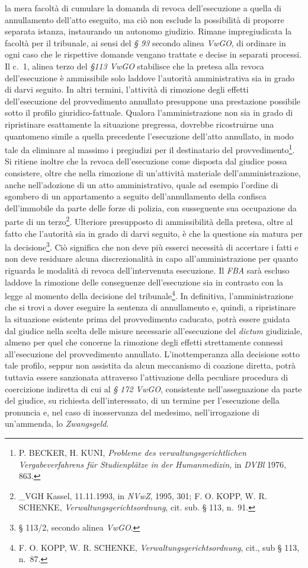 \documentclass[12pt,it,a4paper,]{report}
\begin{document}
la mera facoltà di cumulare la domanda di revoca dell'esecuzione a
quella di annullamento dell'atto eseguito, ma ciò non esclude la
possibilità di proporre separata istanza, instaurando un autonomo
giudizio. Rimane impregiudicata la facoltà per il tribunale, ai sensi
del \emph{§ 93} secondo alinea \emph{VwGO}, di ordinare in ogni caso che
le rispettive domande vengano trattate e decise in separati processi. Il
c.~1, alinea terzo del \emph{§113 VwGO} stabilisce che la pretesa alla
revoca dell'esecuzione è ammissibile solo laddove l'autorità
amministrativa sia in grado di darvi seguito. In altri termini,
l'attività di rimozione degli effetti dell'esecuzione del provvedimento
annullato presuppone una prestazione possibile sotto il profilo
giuridico-fattuale. Qualora l'amministrazione non sia in grado di
ripristinare esattamente la situazione pregressa, dovrebbe ricostruirne
una quantomeno simile a quella precedente l'esecuzione dell'atto
annullato, in modo tale da eliminare al massimo i pregiudizi per il
destinatario del provvedimento\footnote{P. BECKER, H. KUNI,
  \emph{Probleme des verwaltungsgerichtlichen Vergabeverfahrens für
  Studienplätze in der Humanmedizin,} in \emph{DVBl} 1976, 863.}. Si
ritiene inoltre che la revoca dell'esecuzione come disposta dal giudice
possa consistere, oltre che nella rimozione di un'attività materiale
dell'amministrazione, anche nell'adozione di un atto amministrativo,
quale ad esempio l'ordine di sgombero di un appartamento a seguito
dell'annullamento della confisca dell'immobile da parte delle forze di
polizia, con susseguente sua occupazione da parte di un
terzo\footnote{\_VGH Kassel, 11.11.1993, in \emph{NVwZ}, 1995, 301; F.
  O. KOPP, W. R. SCHENKE, \emph{Verwaltungsgerichtsordnung}, cit. sub. §
  113, n.~91.}. Ulteriore presupposto di ammissibilità della pretesa,
oltre al fatto che l'autorità sia in grado di darvi seguito, è che la
questione sia matura per la decisione\footnote{§ 113/2, secondo alinea
  \emph{VwGO}.}. Ciò significa che non deve più esserci necessità di
accertare i fatti e non deve residuare alcuna discrezionalità in capo
all'amministrazione per quanto riguarda le modalità di revoca
dell'intervenuta esecuzione. Il \emph{FBA} sarà escluso laddove la
rimozione delle conseguenze dell'esecuzione sia in contrasto con la
legge al momento della decisione del tribunale\footnote{F. O. KOPP, W.
  R. SCHENKE, \emph{Verwaltungsgerichtsordnung}, cit., sub § 113, n.~87.}.
In definitiva, l'amministrazione che si trovi a dover eseguire la
sentenza di annullamento e, quindi, a ripristinare la situazione
esistente prima del provvedimento caducato, potrà essere guidata dal
giudice nella scelta delle misure necessarie all'esecuzione del
\emph{dictum} giudiziale, almeno per quel che concerne la rimozione
degli effetti strettamente connessi all'esecuzione del provvedimento
annullato. L'inottemperanza alla decisione sotto tale profilo, seppur
non assistita da alcun meccanismo di coazione diretta, potrà tuttavia
essere sanzionata attraverso l'attivazione della peculiare procedura di
coercizione indiretta di cui al \emph{§ 172 VwGO}, consistente
nell'assegnazione da parte del giudice, su richiesta dell'interessato,
di un termine per l'esecuzione della pronuncia e, nel caso di
inosservanza del medesimo, nell'irrogazione di un'ammenda, lo
\emph{Zwangsgeld}.
\end{document}
